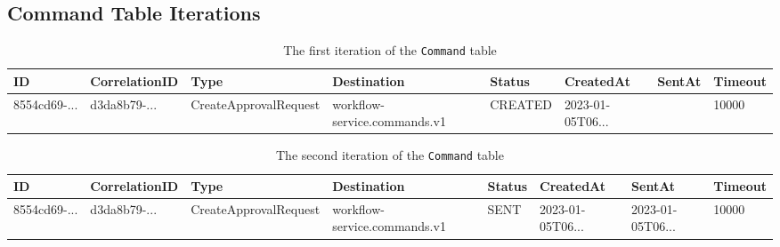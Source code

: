 \documentclass[
  paper=a4,
  parskip=half,
  fontsize=12pt,
  listof=toc,
  titlepage,
  headsepline,
  footsepline,
]{scrartcl}
\begin{document}
\pagestyle{plain.scrheadings}

\setcounter{page}{\value{frontpagecount}}




\pagestyle{plain.scrheadings}

\appendix

\begin{landscape}
  \section{Command Table Iterations}
  \begin{table}[ht]
    \small
    \begin{tabu}{| l | l | l | l | l | l | l | l |}\hline
      \rowfont{\bfseries}
      ID           & CorrelationID & Type                  & Destination                  & Status  & CreatedAt        & SentAt & Timeout \\\hline
      8554cd69-... & d3da8b79-...  & CreateApprovalRequest & workflow-service.commands.v1 & CREATED & 2023-01-05T06... &        & 10000   \\\hline
    \end{tabu}
    \caption{The first iteration of the \texttt{Command} table}\label{tab:command-table-1}
  \end{table}
  \begin{table}[ht]
    \small
    \begin{tabu}{| l | l | l | l | l | l | l | l |}\hline
      \rowfont{\bfseries}
      ID           & CorrelationID & Type                  & Destination                  & Status & CreatedAt        & SentAt           & Timeout \\\hline
      8554cd69-... & d3da8b79-...  & CreateApprovalRequest & workflow-service.commands.v1 & SENT   & 2023-01-05T06... & 2023-01-05T06... & 10000   \\\hline
    \end{tabu}
    \caption{The second iteration of the \texttt{Command} table}\label{tab:command-table-2}
  \end{table}
\end{landscape}

\clearpage

\begin{sloppypar}
  \printbibliography[
    heading=bibintoc %
  ]{}
\end{sloppypar}

\clearpage
\end{document}

